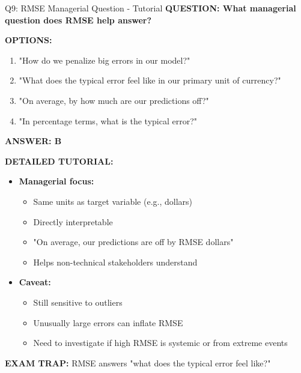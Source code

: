 \documentclass[8pt]{beamer}
\begin{document}
	\begin{frame}{Q9: RMSE Managerial Question - Tutorial}
		\fontsize{6.5}{7.5}\selectfont
		\textbf{QUESTION: What managerial question does RMSE help answer?}
		
		\vspace{0.1cm}
		\textbf{OPTIONS:}
		\begin{enumerate}
			\item "How do we penalize big errors in our model?"
			\item "What does the typical error feel like in our primary unit of currency?"
			\item "On average, by how much are our predictions off?"
			\item "In percentage terms, what is the typical error?"
		\end{enumerate}
		
		\vspace{0.1cm}
		\textcolor{myblue}{\textbf{ANSWER: B}}
		
		\vspace{0.1cm}
		\textbf{DETAILED TUTORIAL:}
		\begin{itemize}
			\item \textbf{Managerial focus:}
			\begin{itemize}
				\item Same units as target variable (e.g., dollars)
				\item Directly interpretable
				\item "On average, our predictions are off by RMSE dollars"
				\item Helps non-technical stakeholders understand
			\end{itemize}
			\item \textbf{Caveat:}
			\begin{itemize}
				\item Still sensitive to outliers
				\item Unusually large errors can inflate RMSE
				\item Need to investigate if high RMSE is systemic or from extreme events
			\end{itemize}
		\end{itemize}
		
		\textcolor{myred}{\textbf{EXAM TRAP:}} RMSE answers \textcolor{myblue}{"what does the typical error feel like?"}
	\end{frame}
	
\end{document}
